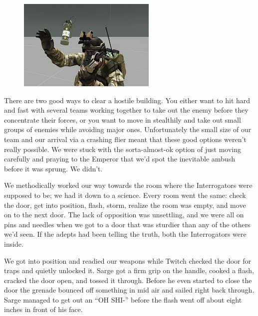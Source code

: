 \begin{figure}
	\begin{center}
		\includegraphics[width=\figwidth]{pics/5/30.png}
	\end{center}
\end{figure}
There are two good ways to clear a hostile building. 
You either want to hit hard and fast with several teams working together to take out the enemy before they concentrate their forces, or you want to move in stealthily and take out small groups of enemies while avoiding major ones. 
Unfortunately the small size of our team and our arrival via a crashing flier meant that these good options weren’t really possible. 
We were stuck with the sorta-almost-ok option of just moving carefully and praying to the Emperor that we’d spot the inevitable ambush before it was sprung. 
We didn’t.

We methodically worked our way towards the room where the Interrogators were supposed to be; 
we had it down to a science. Every room went the same: 
check the door, get into position, flash, storm, realize the room was empty, and move on to the next door. 
The lack of opposition was unsettling, and we were all on pins and needles when we got to a door that was sturdier than any of the others we’d seen. 
If the adepts had been telling the truth, both the Interrogators were inside.

We got into position and readied our weapons while Twitch checked the door for traps and quietly unlocked it. 
Sarge got a firm grip on the handle, cooked a flash, cracked the door open, and tossed it through. 
Before he even started to close the door the grenade bounced off something in mid air and sailed right back through. 
Sarge managed to get out an “OH SHI-” before the flash went off about eight inches in front of his face.

